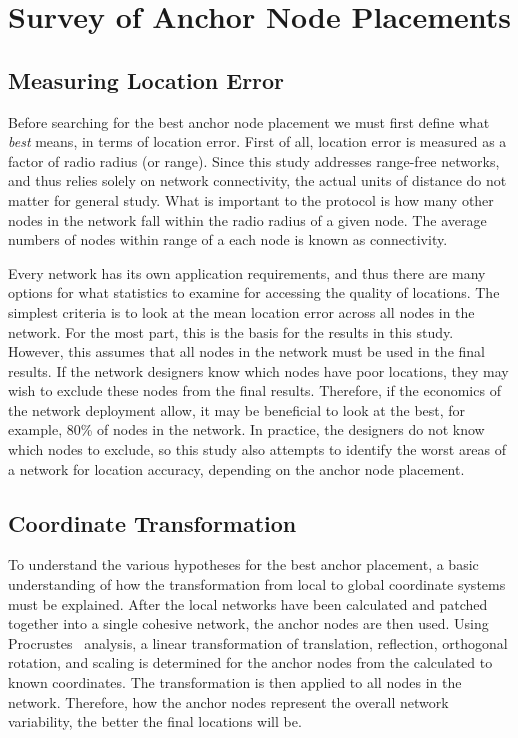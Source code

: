 \chapter{Survey of Anchor Node Placements}

\section{Measuring Location Error}
Before searching for the best anchor node placement we must first define what \emph{best} means, in terms of location error.  First of all, location error is measured as a factor of radio radius (or range).  Since this study addresses range-free networks, and thus relies solely on network connectivity, the actual units of distance do not matter for general study.  What is important to the protocol is how many other nodes in the network fall within the radio radius of a given node.  The average numbers of nodes within range of a each node is known as connectivity.

Every network has its own application requirements, and thus there are many options for what statistics to examine for accessing the quality of locations.  The simplest criteria is to look at the mean location error across all nodes in the network.  For the most part, this is the basis for the results in this study.  However, this assumes that all nodes in the network must be used in the final results.  If the network designers know which nodes have poor locations, they may wish to exclude these nodes from the final results.  Therefore, if the economics of the network deployment allow, it may be beneficial to look at the best, for example, 80\% of nodes in the network.  In practice, the designers do not know which nodes to exclude, so this study also attempts to identify the worst areas of a network for location accuracy, depending on the anchor node placement.  

\section{Coordinate Transformation}
To understand the various hypotheses for the best anchor placement, a basic understanding of how the transformation from local to global coordinate systems must be explained.  After the local networks have been calculated and patched together into a single cohesive network, the anchor nodes are then used. Using Procrustes~\cite{procrustes-matlab} analysis, a linear transformation of translation, reflection, orthogonal rotation, and scaling is determined for the anchor nodes from the calculated to known coordinates. The transformation is then applied to all nodes in the network. Therefore, how the anchor nodes represent the overall network variability, the better the final locations will be.

